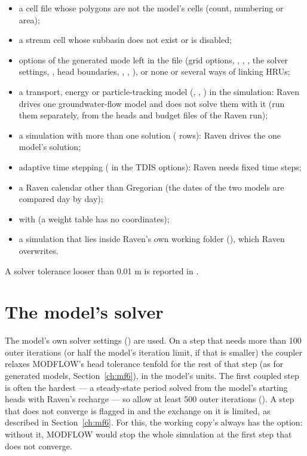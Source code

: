 \begin{itemize}
      have under that name;
\item a cell file whose polygons are not the model's cells (count, numbering or area);
\item a stream cell whose subbasin does not exist or is disabled;
\item options of the generated mode left in the  file (grid options, , ,
      , the solver settings, , head boundaries, , ,
      ),
      or none or several ways of linking HRUs;
\item a transport, energy or particle-tracking model (, , ) in the simulation: Raven drives one
      groundwater-flow model and does not solve them with it (run them separately, from the heads and budget files of the Raven run);
\item a simulation with more than one solution ( rows): Raven drives the one model's solution;
\item adaptive time stepping ( in the TDIS options): Raven needs fixed time steps;
\item a Raven calendar other than Gregorian (the dates of the two models are compared day by day);
\item {} with  (a weight table has no coordinates);
\item a simulation that lies inside Raven's own working folder (), which Raven overwrites.
\end{itemize}
A solver tolerance looser than 0.01 m is reported in .

\section{The model's solver}
The model's own solver settings () are used. On a step that needs more than 100 outer iterations (or half the
model's iteration limit, if that is smaller) the coupler relaxes
MODFLOW's head tolerance tenfold for the rest of that step (as for generated models, Section~\ref{ch:mf6}), in the model's
units. The first coupled step is often the hardest --- a steady-state period solved from the model's starting heads with
Raven's recharge --- so allow at least 500 outer iterations (). A step that does not converge is flagged
in  and the exchange on it is limited, as described in Section~\ref{ch:mf6}. For this, the working copy's
 always has the  option: without it, MODFLOW would stop the whole simulation at the first step
that does not converge.

